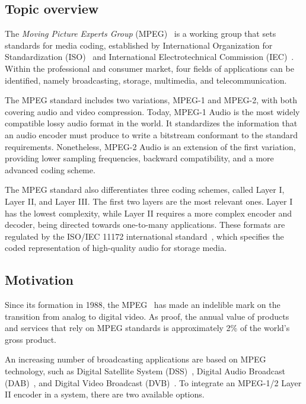 \subsection{Topic overview}

The \textit{Moving Picture Experts Group} (MPEG)~\cite{MPEG} is a working group that sets standards for media coding, established by International Organization for Standardization (ISO)~\cite{iso} and International Electrotechnical Commission (IEC)~\cite{iec}. Within the professional and consumer market, four fields of applications can be identified, namely broadcasting, storage, multimedia, and telecommunication.

The MPEG standard includes two variations, MPEG-1 and MPEG-2, with both covering audio and video compression.  Today, MPEG-1 Audio is the most widely compatible lossy audio format in the world. It standardizes the information that an audio encoder must produce to write a bitstream conformant to the standard requirements.  Nonetheless, MPEG-2 Audio is an extension of the first variation, providing lower sampling frequencies, backward compatibility, and a more advanced coding scheme.

The MPEG standard also differentiates three coding schemes, called Layer I, Layer II, and Layer III.  The first two layers are the most relevant ones. Layer I has the lowest complexity, while Layer II requires a more complex encoder and decoder, being directed towards one-to-many applications. These formats are regulated by the ISO/IEC 11172 international standard~\cite{11172}, which specifies the coded representation of high-quality audio for storage media.

\subsection{Motivation}

Since its formation in 1988, the MPEG~\cite{MPEG} has made an indelible mark on the transition from analog to digital video. As proof, the annual value of products and services that rely on MPEG standards is approximately 2\% of the world's gross product.

An increasing number of broadcasting applications are based on MPEG technology, such as Digital Satellite System (DSS)~\cite{dss}, Digital Audio Broadcast (DAB)~\cite{dab}, and Digital Video Broadcast (DVB)~\cite{dvb}. To integrate an MPEG-1/2 Layer II encoder in a system, there are two available options.

